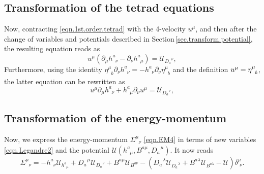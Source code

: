 \documentclass[
10pt, %
a4paper, %
oneside, %
headinclude,footinclude, %
BCOR5mm, %
]{scrartcl}
\newcommand{\tetrsymbol}{h}
\newcommand{\itetrsymbol}{\eta}
\newcommand{\itetr}[2]{\itetrsymbol^{#1}_{\phantom{#1}#2}}
\newcommand{\tetr}[2]{\tetrsymbol^{#1}_{\phantom{#1}#2}}
\newcommand{\D}[1]{\partial_{#1}} %
\newcommand{\Tors}[2]{T^{#1}_{\phantom{a}#2}}
\newcommand{\dT}[2]{D_{#1}^{\phantom{#1}\,#2}}	%
\newcommand{\bT}[2]{B^{#1#2}}	%
\newcommand{\LagST}{\mathcal{U}}%
\newcommand{\EM}[2]{\Sigma^{#1}_{\phantom{#1}#2}}
\newcommand{\KD}[2]{\delta^{#1}_{\,\,#2}}
\newcommand{\indalg}[1]{\hat{\mathsmaller{#1}}}
\begin{document}
\subsection{Transformation of the tetrad equations}

%
%


Now, contracting \eqref{eqn.1st.order.tetrad} with the 4-velocity $ u^\mu $, and then after the 
change of variables and potentials described in Section\,\ref{sec.transform.potential}, the 
resulting equation reads as
\begin{equation}
	u^\mu(\D{\mu}\tetr{a}{\nu} - \D{\nu}\tetr{a}{\mu}) = \LagST_{\dT{a}{\nu}},
\end{equation}
Furthermore, using the identity $ \itetr{\mu}{b}\D{\nu}\tetr{a}{\nu} = - 
\tetr{a}{\nu}\D{\nu}\itetr{\mu}{b}$ and the definition $ u^\mu = \itetr{\mu}{\indalg{0}} 
$, the 
latter equation can be rewritten as
\begin{equation}
	u^\mu\D{\mu}\tetr{a}{\nu} + \tetr{a}{\mu}\D{\nu}u^\mu = \LagST_{\dT{a}{\nu}},
\end{equation}


\subsection{Transformation of the energy-momentum}
Now, we express the energy-momentum $ \EM{\mu}{\nu} $ \eqref{eqn.EM4} in terms of new variables 
\eqref{eqn.Legandre2} and 
the potential $ \LagST(\tetr{a}{\mu},\bT{a}{\mu},\dT{a}{\mu}) $. It now reads
\begin{equation}\label{eqn.EM.BD}
	\EM{\mu}{\nu} = 
	- \tetr{a}{\nu} \LagST_{\tetr{a}{\mu}}
	+ \dT{a}{\mu}\LagST_{\dT{a}{\nu}} + \bT{a}{\mu}\LagST_{\bT{a}{\nu}}
	- (
	\dT{a}{\lambda}\LagST_{\dT{a}{\lambda}}+ \bT{a}{\lambda}\LagST_{\bT{a}{\lambda}}
	-\LagST
	) \KD{\mu}{\nu}.
\end{equation}
\end{document}
